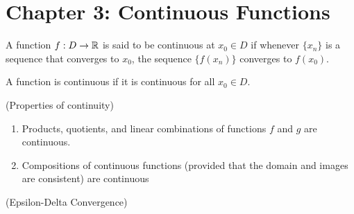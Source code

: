 \documentclass{article}
\begin{document}
\newpage
\section{Chapter 3: Continuous Functions}

\begin{definition}
    A function $f:D\rightarrow \mathbb{R}$ is said to be continuous at $x_0\in D$ if whenever
    $\{x_n\}$ is a sequence that converges to $x_0$, the sequence $\{f(x_n)\}$ converges
    to $f(x_0)$.

    A function is continuous if it is continuous for all $x_0\in D$.
\end{definition}

\begin{theorem} (Properties of continuity)
    \begin{enumerate}
        \item Products, quotients, and linear combinations of functions $f$ and $g$ are continuous.
        \item Compositions of continuous functions (provided that the domain and images are 
        consistent) are continuous
    \end{enumerate}
\end{theorem}

\begin{definition}
    (Epsilon-Delta Convergence)
\end{definition}
\end{document}
